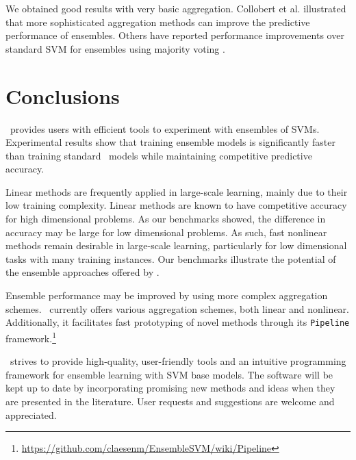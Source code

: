 We obtained good results with very basic aggregation. Collobert et al. \citep{Collobert02} illustrated that more sophisticated aggregation methods can improve the predictive performance of ensembles. Others have reported performance improvements over standard SVM for
ensembles using majority voting \citep{Valentini03lowbias,Wang20096466}.
 
\section{Conclusions}
\esvm\ provides users with efficient tools to experiment with ensembles of
SVMs. Experimental results show that training ensemble models is significantly
faster than training standard \libsvm\ models while maintaining competitive predictive accuracy.

Linear methods are frequently applied in large-scale learning, mainly due to their low training complexity. Linear methods are known to have competitive accuracy for high dimensional problems. As our benchmarks showed, the difference in accuracy may be large for low dimensional problems. As such, fast nonlinear methods remain desirable in large-scale learning, particularly for low dimensional tasks with many training instances. Our benchmarks illustrate the potential of the ensemble approaches offered by \esvm.

Ensemble performance may be improved by using more complex aggregation schemes. \esvm\ currently offers various aggregation schemes, both linear and nonlinear. Additionally, it facilitates fast prototyping of novel methods through its \texttt{Pipeline} framework.\footnote{\url{https://github.com/claesenm/EnsembleSVM/wiki/Pipeline}}

\esvm\ strives to provide high-quality,
user-friendly tools and an intuitive programming framework for ensemble learning with SVM base models. The software will be kept up to date by incorporating promising new methods and ideas when they are presented in the literature. User requests and suggestions are welcome and appreciated.



\cleardoublepage

